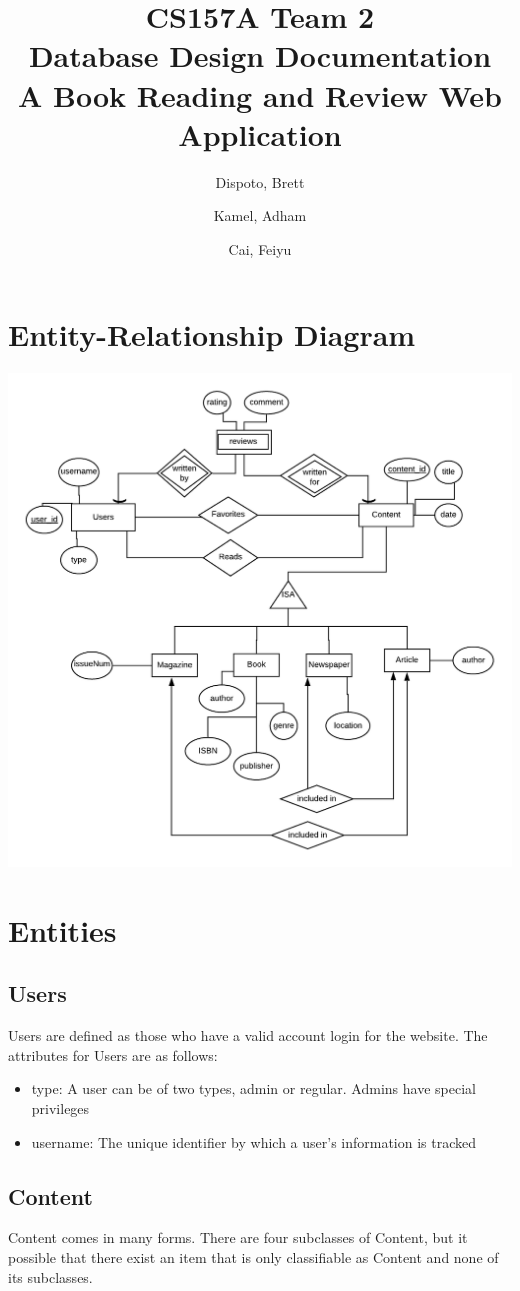 \documentclass[letter, 12pt, titlepage]{article}
\author{
	Dispoto, Brett\\
        \and
        Kamel, Adham\\
        \and
        Cai, Feiyu\\
}
\title{CS157A Team 2 \\ Database Design Documentation \\
        \large A Book Reading and Review Web Application}
\begin{document}
  \maketitle
  	\section{Entity-Relationship Diagram}
	\includegraphics[scale=1]{erd.png}
	\section{Entities}
		\subsection{Users}
			Users are defined as those who have a valid account login for the website.
			The attributes for Users are as follows:
			\begin{itemize}
				\item type: A user can be of two types, admin or regular. Admins have special privileges
				\item username: The unique identifier by which a user's information is tracked
			\end{itemize}
		\subsection{Content}
				Content comes in many forms. There are four subclasses of Content, but it possible that there exist an item that is only classifiable as Content and none of its subclasses. 
			
\end{document}
